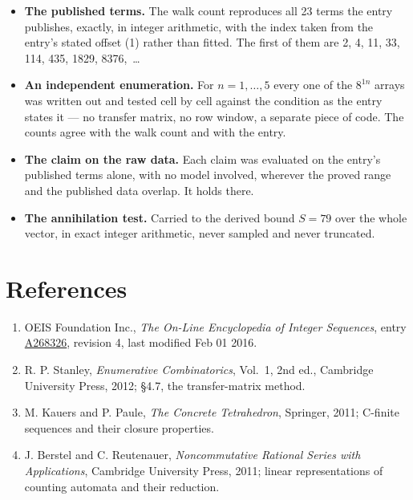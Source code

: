 \documentclass[11pt]{article}
\theoremstyle{definition}
\begin{document}
\begin{itemize}

\item {\bfseries The published terms.} The walk count reproduces all 23 terms the entry publishes, exactly, in integer arithmetic, with the index taken from the entry's stated offset (1) rather than fitted. The first of them are 2, 4, 11, 33, 114, 435, 1829, 8376,~\dots

\item {\bfseries An independent enumeration.} For $n = 1,\dots,5$ every one of the $8^{1n}$ arrays was written out and tested cell by cell against the condition as the entry states it --- no transfer matrix, no row window, a separate piece of code. The counts agree with the walk count and with the entry.

\item {\bfseries The claim on the raw data.} Each claim was evaluated on the entry's published terms alone, with no model involved, wherever the proved range and the published data overlap. It holds there.

\item {\bfseries The annihilation test.} Carried to the derived bound $S = 79$ over the whole vector, in exact integer arithmetic, never sampled and never truncated.

\end{itemize}

\section{References}

\begin{enumerate}

\item OEIS Foundation Inc., \emph{The On-Line Encyclopedia of Integer Sequences}, entry \href{https://oeis.org/A268326}{A268326}, revision 4, last modified Feb 01 2016.

\item R. P. Stanley, \emph{Enumerative Combinatorics}, Vol.~1, 2nd ed., Cambridge University Press, 2012; \S4.7, the transfer-matrix method.

\item M. Kauers and P. Paule, \emph{The Concrete Tetrahedron}, Springer, 2011; C-finite sequences and their closure properties.

\item J. Berstel and C. Reutenauer, \emph{Noncommutative Rational Series with Applications}, Cambridge University Press, 2011; linear representations of counting automata and their reduction.

\end{enumerate}
\end{document}
